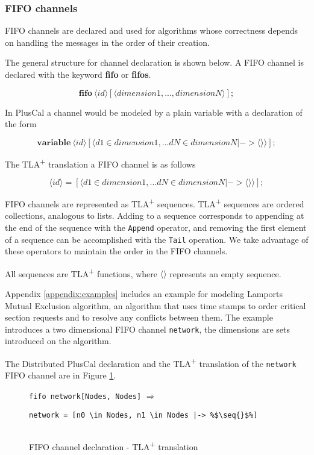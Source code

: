 \documentclass[journal]{IEEEtran}
\newcommand{\tlaplus}{TLA\textsuperscript{+}\xspace}
\newcommand{\seq}[1]{\langle #1 \rangle}
\newcommand{\keyword}[1]{\textbf{#1}}
\newcommand{\entity}[1]{\ensuremath{\langle}#1\ensuremath{\rangle}}
\begin{document}
\subsubsection{FIFO channels}

FIFO channels are declared and used for algorithms whose correctness depends on handling the messages in the order of their creation.

The general structure for channel declaration is shown below. A FIFO channel is declared with the keyword \keyword{fifo} or \keyword{fifos}. 

\[
 \keyword{fifo}\ \entity{id}[\entity{dimension1,...,dimensionN}];
\]

In PlusCal a channel would be modeled by a plain variable with a declaration of the form

\[
 \keyword{variable}\ \entity{id}[\entity{d1 \in dimension1,... dN \in dimensionN |-> \seq{}}];
\]

The \tlaplus translation a FIFO channel is as follows

\[
 \entity{id} = [\entity{d1 \in dimension1,... dN \in dimensionN |-> \seq{}}];
\]


FIFO channels are represented as \tlaplus sequences.
\tlaplus sequences are ordered collections, analogous to lists. Adding to a sequence corresponds to appending at the end of the sequence with the \verb|Append| operator, and removing the first element of a sequence can be accomplished with the \verb|Tail| operation. We take advantage of these operators to maintain the order in the FIFO channels.

All sequences are \tlaplus functions, where $\seq{}$ represents an empty sequence.

Appendix \ref{appendix:examples} includes an example for modeling Lamports Mutual Exclusion algorithm, an algorithm that uses time stamps to order critical section requests and to resolve any conflicts between them. The example introduces a two dimensional FIFO channel \verb|network|, the dimensions are sets introduced on the algorithm.

The Distributed PlusCal declaration and the \tlaplus translation of the \verb|network| FIFO channel are in Figure \ref{fifochannels}.
 

\FloatBarrier
\begin{figure}[!h]
\lstinline|fifo network[Nodes, Nodes]| $\Rightarrow$ 
\begin{lstlisting}[escapechar=\%, frame = none, numbers = none]
network = [n0 \in Nodes, n1 \in Nodes |-> %$\seq{}$%]
  
\end{lstlisting}  
\caption{FIFO channel declaration - \tlaplus translation}
\label{fifochannels}
\end{figure}
\FloatBarrier
\end{document}
